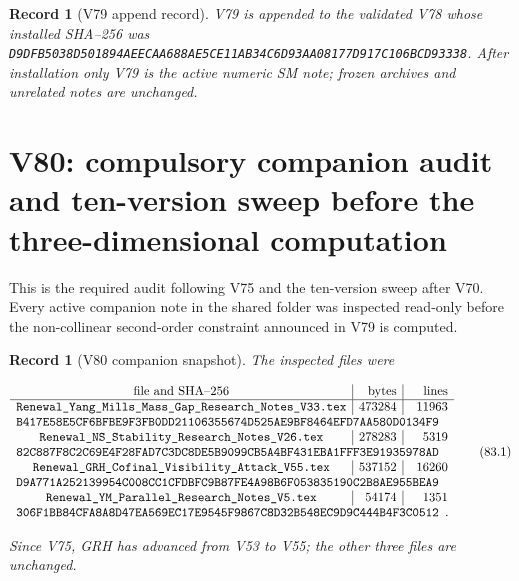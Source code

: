 \documentclass[11pt]{article}
\newtheorem{record}[theorem]{Record}
\theoremstyle{remark}
\begin{document}
\begin{record}[V79 append record]
\label{rec:v19v79}
V79 is appended to the validated V78 whose installed SHA--256 was
\texttt{D9DFB5038D501894AEECAA688AE5CE11AB34C6D93AA08177D917C106BCD93338}.
After installation only V79 is the active numeric SM note; frozen
archives and unrelated notes are unchanged.
\end{record}


\section{V80: compulsory companion audit and ten-version sweep before the three-dimensional computation}
\label{sec:v19v80}

This is the required audit following V75 and the ten-version sweep
after V70.  Every active companion note in the shared folder was
inspected read-only before the non-collinear second-order constraint
announced in V79 is computed.

\begin{record}[V80 companion snapshot]
\label{rec:v19v80-snapshot}
The inspected files were

\[
\begin{array}{c|r|r}
\hbox{file and SHA--256}&\hbox{bytes}&\hbox{lines}\\ \hline
\texttt{Renewal\_Yang\_Mills\_Mass\_Gap\_Research\_Notes\_V33.tex}
&473284&11963\\
\multicolumn{3}{l}{
\texttt{B417E58E5CF6BFBE9F3FB0DD21106355674D525AE9BF8464EFD7AA580D0134F9}}
\\
\texttt{Renewal\_NS\_Stability\_Research\_Notes\_V26.tex}
&278283&5319\\
\multicolumn{3}{l}{
\texttt{82C887F8C2C69E4F28FAD7C3DC8DE5B9099CB5A4BF431EBA1FFF3E91935978AD}}
\\
\texttt{Renewal\_GRH\_Cofinal\_Visibility\_Attack\_V55.tex}
&537152&16260\\
\multicolumn{3}{l}{
\texttt{D9A771A252139954C008CC1CFDBFC9B87FE4A98B6F053835190C2B8AE955BEA9}}
\\
\texttt{Renewal\_YM\_Parallel\_Research\_Notes\_V5.tex}
&54174&1351\\
\multicolumn{3}{l}{
\texttt{306F1BB84CFA8A8D47EA569EC17E9545F9867C8D32B548EC9D9C444B4F3C0512}}.
\end{array}                                                     \tag{83.1}
\]

Since V75, GRH has advanced from V53 to V55; the other three files are
unchanged.
\end{record}
\end{document}

